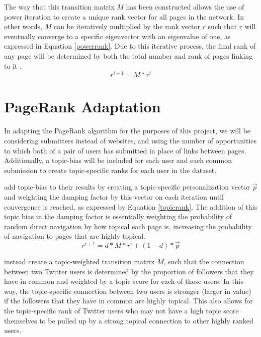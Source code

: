 \documentclass[]{report}   %
\begin{document}
The way that this transition matrix $M$ has been constructed allows the use of power iteration to create a unique rank vector for all pages in the network. In other words, $M$ can be iteratively multiplied by the rank vector $r$ such that $r$ will eventually converge to a specific eigenvector with an eigenvalue of one, as expressed in Equation \ref{powerrank}. Due to this iterative process, the final rank of any page will be determined by both the total number and rank of pages linking to it \cite{haveliwala_2002}.
\begin{equation}
\label{powerrank}
r^{i+1}=M*r^{i}
\end{equation}

\section{PageRank Adaptation}

In adapting the PageRank algorithm for the purposes of this project, we will be considering submitters instead of websites, and using the number of opportunities to which both of a pair of users has submitted in place of links between pages. Additionally, a topic-bias will be included for each user and each common submission to create topic-specific ranks for each user in the dataset.

 add topic-bias to their results by creating a topic-specific personalization vector $\vec{p}$ and weighting the damping factor by this vector on each iteration until convergence is reached, as expressed by Equation \ref{topicrank}. The addition of this topic bias in the damping factor is essentially weighting the probability of random direct navigation by how topical each page is, increasing the probability of navigation to pages that are highly topical. 
\begin{equation}
\label{topicrank}
 r^{i+1}=d*M*r^{i}+(1-d)*\vec{p}
\end{equation}

 instead create a topic-weighted transition matrix $M$, such that the connection between two Twitter users is determined by the proportion of followers that they have in common and weighted by a topic score for each of those users. In this way, the topic-specific connection between two users is stronger (larger in value) if the followers that they have in common are highly topical. This also allows for the topic-specific rank of Twitter users who may not have a high topic score themselves to be pulled up by a strong topical connection to other highly ranked users.
\end{document}
